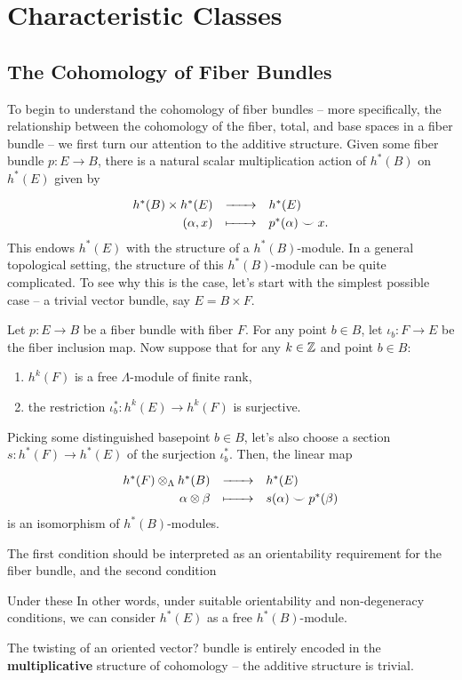 \chapter{Characteristic Classes}\label{chapter:characteristic_classes}

\section{The Cohomology of Fiber Bundles}


To begin to understand the cohomology of fiber bundles -- more specifically, the relationship between the cohomology of the fiber, total, and base spaces in a fiber bundle -- we first turn our attention to the additive structure. Given some fiber bundle $p : E \to B$, there is a natural scalar multiplication action of $h^*(B)$ on $h^*(E)$ given by
\[
  \definefunction{}{h^*(B)\times h^*(E)}{h^*(E)}{(\alpha, x)}{p^*(\alpha)\smile x.}
\]
This endows $h^*(E)$ with the structure of a $h^*(B)$-module. In a general topological setting, the structure of this $h^*(B)$-module can be quite complicated. To see why this is the case, let's start with the simplest possible case -- a trivial vector bundle, say $E=B\times F$. 

\begin{theorem}\label{thm:leray-hirsch} Let $p : E \to B$ be a fiber bundle with fiber $F$. For any point $b\in B$, let $\iota_b : F \to E$ be the fiber inclusion map. Now suppose that for any $k\in \mathbb{Z}$ and point $b\in B$:
  \begin{enumerate}
    \item $h^k(F)$ is a free $\Lambda$-module of finite rank,
    \item the restriction $\iota_b^* : h^k(E) \to h^k(F)$ is surjective.
  \end{enumerate}
  Picking some distinguished basepoint $b\in B$, let's also choose a section $s : h^*(F) \to h^*(E)$ of the surjection $\iota_b^*$. Then, the linear map
  \[
    \definefunction{}{h^*(F)\otimes_\Lambda h^*(B)}{h^*(E)}{\alpha\otimes \beta}{s(\alpha)\smile p^*(\beta)}
  \]
  is an isomorphism of $h^*(B)$-modules.
\end{theorem}

The first condition should be interpreted as an orientability requirement for the fiber bundle, and the second condition

Under these
In other words, under suitable orientability and non-degeneracy conditions, we can consider $h^*(E)$ as a free $h^*(B)$-module.

\begin{insight}
  The twisting of an oriented vector? bundle is entirely encoded in the \textbf{multiplicative} structure of cohomology -- the additive structure is trivial.
\end{insight}
